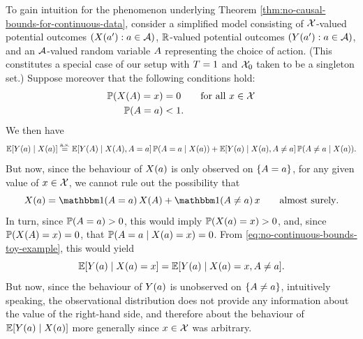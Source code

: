 To gain intuition for the phenomenon underlying Theorem \ref{thm:no-causal-bounds-for-continuous-data}, consider a simplified model consisting of $\mathcal{X}$-valued potential outcomes $(X(a') : a \in \mathcal{A})$, $\mathbb{R}$-valued potential outcomes $(Y(a') : a \in \mathcal{A})$, and an $\mathcal{A}$-valued random variable $A$ representing the choice of action.
(This constitutes a special case of our setup with $T = 1$ and $\mathcal{X}_0$ taken to be a singleton set.)
Suppose moreover that the following conditions hold:
\begin{align*}
    \mathbb{P}(X(A) = x) &= 0 \qquad \text{for all $x \in \mathcal{X}$} \\
    \mathbb{P}(A = a) &< 1.
\end{align*}
We then have
\begin{equation} \label{eq:no-continuous-bounds-toy-example}
    \mathbb{E}[Y(a) \mid X(a)]
        \overset{\mathrm{a.s.}}{=} \mathbb{E}[Y(A) \mid X(A), A = a] \, \mathbb{P}(A = a \mid X(a)) + \mathbb{E}[Y(a) \mid X(a), A \neq a] \, \mathbb{P}(A \neq a \mid X(a)).
\end{equation}
But now, since the behaviour of $X(a)$ is only observed on $\{A = a\}$, for any given value of $x \in \mathcal{X}$, we cannot rule out the possibility that
\[
    \X(\ax) = \ind(\A = \ax) \, \X(\A) + \ind(\A \neq \ax) \, \xx \qquad \text{almost surely}.
\]
In turn, since $\mathbb{P}(A = a) > 0$, this would imply $\mathbb{P}(X(a) = x) > 0$, and, since $\mathbb{P}(X(A) = x) = 0$, that $\mathbb{P}(A = a \mid X(a) = x) = 0$.
From \eqref{eq:no-continuous-bounds-toy-example}, this would yield
\[
    \mathbb{E}[Y(a) \mid X(a) = x] = \mathbb{E}[Y(a) \mid X(a) = x, A \neq a].
\]
But now, since the behaviour of $Y(a)$ is unobserved on $\{A \neq a\}$, intuitively speaking, the observational distribution does not provide any information about the value of the right-hand side, and therefore about the behaviour of $\mathbb{E}[Y(a) \mid X(a)]$ more generally since $x \in \mathcal{X}$ was arbitrary.

